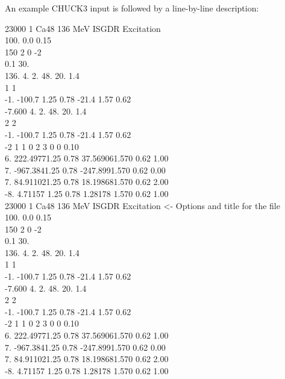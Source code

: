 \documentclass[a4paper,10pt]{article}
\begin{document}
An example CHUCK3 input is followed by a line-by-line description:

     23000     1    Ca48  136 MeV      ISGDR Excitation\\
100.    0.0    0.15\\
150  2  0 -2\\
0.1     30.\\
136.    4.      2.      48.     20.     1.4\\
  1  1\\
-1.     -100.7  1.25    0.78            -21.4   1.57    0.62 \\
-7.600  4.      2.      48.     20.     1.4\\
  2  2\\
-1.     -100.7  1.25    0.78            -21.4   1.57    0.62 \\
 -2  1  1  0  2  3  0  0 0.10\\
6.      222.49771.25    0.78            37.569061.570   0.62            1.00\\
7.      -967.3841.25    0.78            -247.8991.570   0.62            0.00\\
7.      84.911021.25    0.78            18.198681.570   0.62            2.00\\
-8.     4.71157 1.25    0.78            1.28178 1.570   0.62            1.00\\

     23000     1    Ca48  136 MeV      ISGDR Excitation <- Options and title for the file\\
100.    0.0    0.15\\
150  2  0 -2\\
0.1     30.\\
136.    4.      2.      48.     20.     1.4\\
  1  1\\
-1.     -100.7  1.25    0.78            -21.4   1.57    0.62 \\
-7.600  4.      2.      48.     20.     1.4\\
  2  2\\
-1.     -100.7  1.25    0.78            -21.4   1.57    0.62 \\
 -2  1  1  0  2  3  0  0 0.10\\
6.      222.49771.25    0.78            37.569061.570   0.62            1.00\\
7.      -967.3841.25    0.78            -247.8991.570   0.62            0.00\\
7.      84.911021.25    0.78            18.198681.570   0.62            2.00\\
-8.     4.71157 1.25    0.78            1.28178 1.570   0.62            1.00\\
\end{document}
